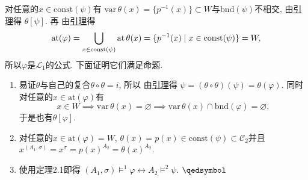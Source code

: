 对任意的$x\in\mathrm{const}(\psi)$有
$\mathrm{var}\,\theta(x)=\{p^{-1}(x)\}\subset W$与$\mathrm{bnd}(\psi)$不相交,
由\href{../../01 一阶语言/05 单点替换#nameddest=sec:定理1.6}{引理}得
$\theta[\psi]$. 再
由\href{../../01 一阶语言/04 一般替换#nameddest=sec:定理3.2}{引理}得
\[
    \mathrm{at}(\varphi)=
    \bigcup_{x\in\mathrm{const}(\psi)}\mathrm{at}\,\theta(x)=
    \{p^{-1}(x)\mid x\in\mathrm{const}(\psi)\}=W,\\[3pt]
\]
所以$\varphi$是$\mathcal{L}_1$的公式. 下面证明它们满足命题.

\begin{enumerate}
    \item 易证$\theta$与自己的复合$\theta\circ\theta=i$, 所以
    由\href{../../01 一阶语言/04 一般替换#nameddest=sec:定理4.2}{引理}得
    $\psi=(\theta\circ\theta)(\psi)=\theta(\varphi)$.
    同时对任意的$x\in\mathrm{at}(\varphi)$有
    \[
        x\in W\implies\mathrm{var}\,\theta(x)=\varnothing\implies
        \mathrm{var}\,\theta(x)\cap\mathrm{bnd}(\varphi)=\varnothing,
    \]
    于是也有$\theta[\varphi]$.
    \item 对任意的$x\in\mathrm{at}(\varphi)=W$,
    $\theta(x)=p(x)\in\mathrm{const}(\psi)\subset\mathcal{C}_2$并且
    $x^{(A_1,\sigma)}=x^\sigma=p(x)^{A_2}=\theta(x)^{A_2}$.
    \item 使用定理2.1即得
    $(A_1,\sigma)\models^1\varphi\leftrightarrow A_2\models^2\psi$.
    \hfill $\qedsymbol$
\end{enumerate}

